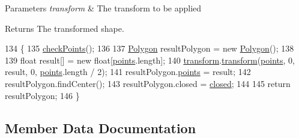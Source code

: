 \begin{DoxyParams}{Parameters}
{\em transform} & The transform to be applied \\
\hline
\end{DoxyParams}
\begin{DoxyReturn}{Returns}
The transformed shape. 
\end{DoxyReturn}

\begin{DoxyCode}
134                                                 \{
135         \mbox{\hyperlink{classorg_1_1newdawn_1_1slick_1_1geom_1_1_shape_a84293802d05e8666a441720bfc12745d}{checkPoints}}();
136         
137         \mbox{\hyperlink{classorg_1_1newdawn_1_1slick_1_1geom_1_1_polygon_aae353d8c33cff787d8ae535036551489}{Polygon}} resultPolygon = \textcolor{keyword}{new} \mbox{\hyperlink{classorg_1_1newdawn_1_1slick_1_1geom_1_1_polygon_aae353d8c33cff787d8ae535036551489}{Polygon}}();
138         
139         \textcolor{keywordtype}{float} result[] = \textcolor{keyword}{new} \textcolor{keywordtype}{float}[\mbox{\hyperlink{classorg_1_1newdawn_1_1slick_1_1geom_1_1_shape_a8b4d4058734bbb3b96072e470b92aa37}{points}}.length];
140         \mbox{\hyperlink{classorg_1_1newdawn_1_1slick_1_1geom_1_1_polygon_ae03273cea4a8bb9f5be71af4bc1c0c8a}{transform}}.\mbox{\hyperlink{classorg_1_1newdawn_1_1slick_1_1geom_1_1_shape_a463826a085479c379e40f012e970b997}{transform}}(\mbox{\hyperlink{classorg_1_1newdawn_1_1slick_1_1geom_1_1_shape_a8b4d4058734bbb3b96072e470b92aa37}{points}}, 0, result, 0, \mbox{\hyperlink{classorg_1_1newdawn_1_1slick_1_1geom_1_1_shape_a8b4d4058734bbb3b96072e470b92aa37}{points}}.length / 2);
141         resultPolygon.\mbox{\hyperlink{classorg_1_1newdawn_1_1slick_1_1geom_1_1_shape_a8b4d4058734bbb3b96072e470b92aa37}{points}} = result;
142         resultPolygon.findCenter();
143         resultPolygon.closed = \mbox{\hyperlink{classorg_1_1newdawn_1_1slick_1_1geom_1_1_polygon_a8ca548fdf2452ba39c43fe3ba20b9ee8}{closed}};
144 
145         \textcolor{keywordflow}{return} resultPolygon;
146     \}
\end{DoxyCode}


\subsection{Member Data Documentation}
\mbox{\label{classorg_1_1newdawn_1_1slick_1_1geom_1_1_polygon_a425e8151c71ea31ba03f5d147f9ef79a}} 
